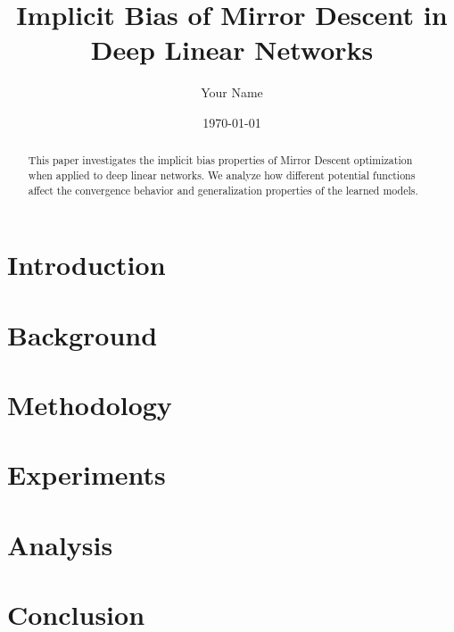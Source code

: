 \documentclass[11pt]{article}
\title{Implicit Bias of Mirror Descent in Deep Linear Networks}
\author{Your Name}
\date{\today}
\begin{document}
\maketitle

\begin{abstract}
This paper investigates the implicit bias properties of Mirror Descent optimization
when applied to deep linear networks. We analyze how different potential functions
affect the convergence behavior and generalization properties of the learned models.
\end{abstract}

\section{Introduction}

\section{Background}

\section{Methodology}

\section{Experiments}

\section{Analysis}

\section{Conclusion}



\end{document}
